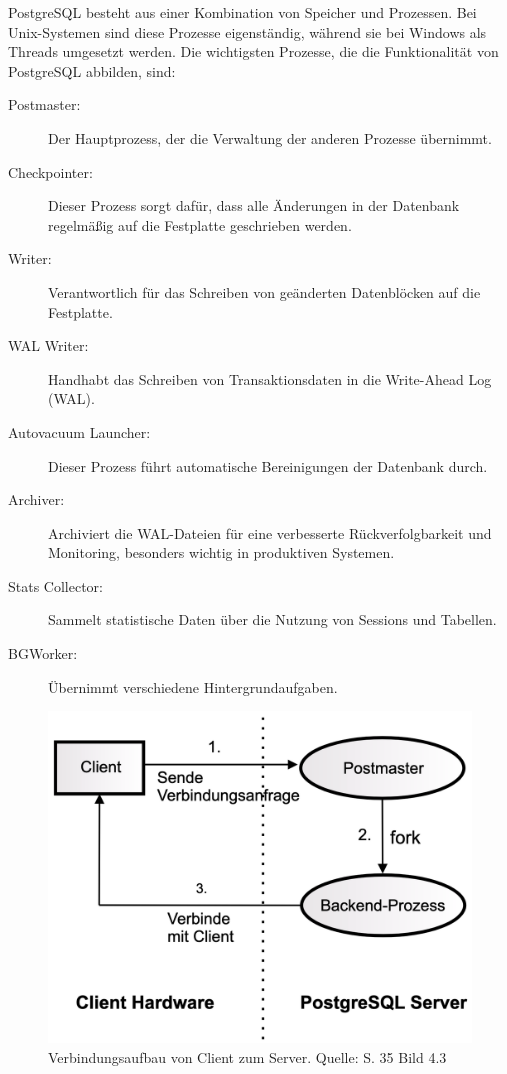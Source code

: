 PostgreSQL besteht aus einer Kombination von Speicher und Prozessen. Bei Unix-Systemen sind diese Prozesse eigenständig, während sie bei Windows als Threads umgesetzt werden. Die wichtigsten Prozesse, die die Funktionalität von PostgreSQL abbilden, sind:
\begin{description}
    \item[Postmaster:] Der Hauptprozess, der die Verwaltung der anderen Prozesse übernimmt.
    \item[Checkpointer:] Dieser Prozess sorgt dafür, dass alle Änderungen in der Datenbank regelmäßig auf die Festplatte geschrieben werden.
    \item[Writer:] Verantwortlich für das Schreiben von geänderten Datenblöcken auf die Festplatte.
    \item[WAL Writer:] Handhabt das Schreiben von Transaktionsdaten in die Write-Ahead Log (WAL).
    \item[Autovacuum Launcher:] Dieser Prozess führt automatische Bereinigungen der Datenbank durch.
    \item[Archiver:] Archiviert die WAL-Dateien für eine verbesserte Rückverfolgbarkeit und Monitoring, besonders wichtig in produktiven Systemen.
    \item[Stats Collector:] Sammelt statistische Daten über die Nutzung von Sessions und Tabellen.
    \item[BGWorker:] Übernimmt verschiedene Hintergrundaufgaben.
\end{description}

\begin{figure}[h]
\centering
\includegraphics[width=\textwidth]{img/PostgreSQL Verbindungsaufbau.png}
\caption{Verbindungsaufbau von Client zum Server. Quelle: \cite{Fröhlich2022} S. 35 Bild 4.3}
\label{fig:Verbindungsaufbau}
\end{figure}

